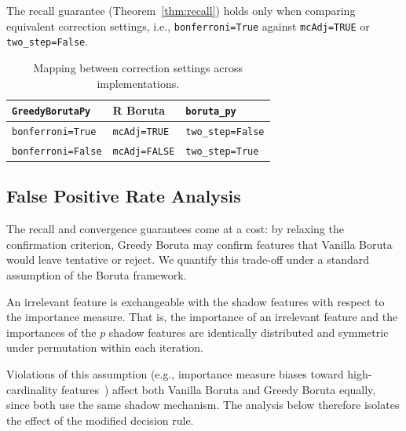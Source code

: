 \documentclass[runningheads]{llncs}
\begin{document}
The recall guarantee (Theorem~\ref{thm:recall}) holds only when comparing equivalent correction settings, i.e., \texttt{bonferroni=True} against \texttt{mcAdj=TRUE} or \texttt{two\_step=False}.

\begin{table}[t]
\centering
\caption{Mapping between correction settings across implementations.}
\label{tab:correction_mapping}
\begin{tabular}{lll}
\toprule
\texttt{GreedyBorutaPy} & R Boruta & \texttt{boruta\_py} \\
\midrule
\texttt{bonferroni=True}  & \texttt{mcAdj=TRUE}  & \texttt{two\_step=False} \\
\texttt{bonferroni=False} & \texttt{mcAdj=FALSE} & \texttt{two\_step=True}\footnotemark \\
\bottomrule
\end{tabular}
\end{table}


\subsection{False Positive Rate Analysis}
\label{sec:method:fpr}

The recall and convergence guarantees come at a cost: by relaxing the confirmation criterion, Greedy Boruta may confirm features that Vanilla Boruta would leave tentative or reject. We quantify this trade-off under a standard assumption of the Boruta framework.

\begin{assumption}
\label{asm:exchangeability}
An irrelevant feature is exchangeable with the shadow features with respect to the importance measure. That is, the importance of an irrelevant feature and the importances of the $p$ shadow features are identically distributed and symmetric under permutation within each iteration.
\end{assumption}

Violations of this assumption (e.g., importance measure biases toward high-cardinality features~\cite{strobl2007bias}) affect both Vanilla Boruta and Greedy Boruta equally, since both use the same shadow mechanism. The analysis below therefore isolates the effect of the modified decision rule.
\end{document}
